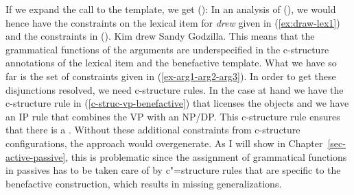 If we expand the call to the  template, we get ():
\ea
\scalebox{.93}{%
\begin{tabular}[t]{@{}l@{}}
      \{ (\up \{\feat{obj}$\mid$\feat{obj}$_\theta$\})\sig $=$  (\upsig \feat{arg}$_3$)  $\mid$
      (\upsig \feat{arg}$_3$)$_{{\sigma}^{-1}}$ $=$ $\varnothing$ \}\\
   \pformula{\lambda x\lambda y\lambda P\lambda e.P(y)(e) ~\wedge~ \textit{beneficiary}\hspace{.1em}(e) = x}
     {(\upsig \feat{arg$_2$}) \linimp 
      (\upsig \feat{arg$_3$}) \linimp\newline {}[(\upsig \feat{arg$_2$}) \linimp (\upsig \feat{event}) \linimp
     \Upsig] \linimp
      (\upsig \feat{event}) \linimp \upsig}
\end{tabular}}%
\z
In an analysis of (), we would hence have the constraints on the lexical item for \emph{drew}
given in (\ref{ex:draw-lex1}) and the constraints in ().
\ea
Kim drew Sandy Godzilla.
\z
This means that the grammatical functions of the arguments are underspecified in the c-structure annotations of the lexical item and
the benefactive template. What we have so far is the set of constraints given in
(\ref{ex-arg1-arg2-arg3}). In order to get these disjunctions
resolved\label{page-disjunctions-gf-c-structure}, 
we need c-structure rules. In the case at hand we have the c-structure rule in (\ref{c-struc-vp-benefactive}) that
licenses the objects and we have an IP rule that combines the VP with an NP/DP. This c-structure
rule ensures that there is a \subjlfg. Without these additional constraints from c-structure
configurations, the approach would overgenerate. As I will show in Chapter~\ref{sec-active-passive}, this is
problematic since the assignment of grammatical functions in passives has to be taken care of by
c"=structure rules that are specific to the benefactive construction, which results in missing
generalizations.%

